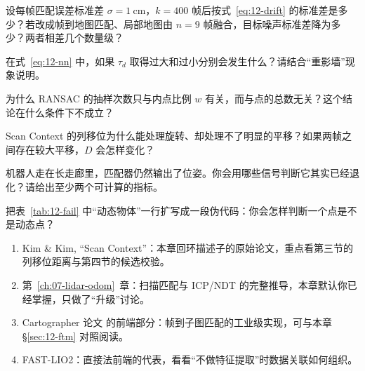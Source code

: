 \begin{problemset}
  \item 设每帧匹配误差标准差 $\sigma=1\ \mathrm{cm}$，$k=400$ 帧后按式~\eqref{eq:12-drift} 的标准差是多少？若改成帧到地图匹配、局部地图由 $n=9$ 帧融合，目标噪声标准差降为多少？两者相差几个数量级？
  \item 在式~\eqref{eq:12-nn} 中，如果 $\tau_d$ 取得过大和过小分别会发生什么？请结合``重影墙''现象说明。
  \item 为什么 RANSAC 的抽样次数只与内点比例 $w$ 有关，而与点的总数无关？这个结论在什么条件下不成立？
  \item Scan Context 的列移位为什么能处理旋转、却处理不了明显的平移？如果两帧之间存在较大平移，$D$ 会怎样变化？
  \item 机器人走在长走廊里，匹配器仍然输出了位姿。你会用哪些信号判断它其实已经退化？请给出至少两个可计算的指标。
  \item 把表~\ref{tab:12-fail} 中``动态物体''一行扩写成一段伪代码：你会怎样判断一个点是不是动态点？
\end{problemset}

\begin{reading}
\begin{enumerate}
  \item Kim \& Kim, ``Scan Context''\cite{kim2018scancontext}：本章回环描述子的原始论文，重点看第三节的列移位距离与第四节的候选校验。
  \item 第~\ref{ch:07-lidar-odom}~章：扫描匹配与 ICP/NDT 的完整推导，本章默认你已经掌握，只做了``升级''讨论。
  \item Cartographer 论文\cite{hess2016cartographer} 的前端部分：帧到子图匹配的工业级实现，可与本章 \S\ref{sec:12-ftm} 对照阅读。
  \item FAST-LIO2\cite{xu2022fastlio2}：直接法前端的代表，看看``不做特征提取''时数据关联如何组织。
\end{enumerate}


\end{reading}

